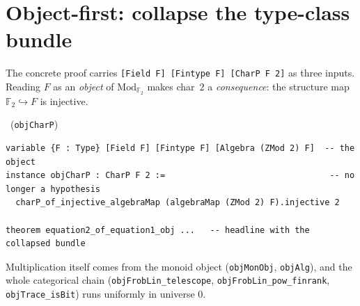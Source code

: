 \documentclass[11pt]{article}
\newcommand{\lc}[1]{\texttt{\small #1}}
\newcommand{\Tr}{\operatorname{Tr}}
\newcommand{\Ff}{\mathbb{F}_2}
\newcommand{\CharP}{\operatorname{CharP}}
\newcommand{\Algebra}{\operatorname{Algebra}}
\begin{document}
\begin{center}
\end{center}

\section{Object-first: collapse the type-class bundle}

The concrete proof carries \lc{[Field F] [Fintype F] [CharP F 2]} as three
inputs. Reading $F$ as an \emph{object} of $\mathrm{Mod}_{\Ff}$ makes char~$2$ a
\emph{consequence}: the structure map $\Ff\hookrightarrow F$ is injective.

\begin{center}
\ (\lc{objCharP})
\end{center}
\begin{lstlisting}
variable {F : Type} [Field F] [Fintype F] [Algebra (ZMod 2) F]  -- the object
instance objCharP : CharP F 2 :=                                 -- no longer a hypothesis
  charP_of_injective_algebraMap (algebraMap (ZMod 2) F).injective 2

theorem equation2_of_equation1_obj ...   -- headline with the collapsed bundle
\end{lstlisting}
Multiplication itself comes from the monoid object
(\lc{objMonObj}, \lc{objAlg}), and the whole categorical chain
(\lc{objFrobLin\_telescope}, \lc{objFrobLin\_pow\_finrank}, \lc{objTrace\_isBit})
runs uniformly in universe $0$.
\end{document}
